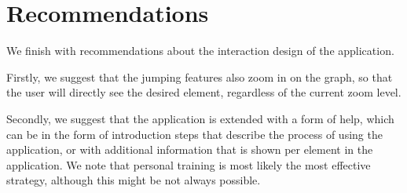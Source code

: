 \section{Recommendations}
We finish with recommendations about the interaction design of the application.
\par
Firstly, we suggest that the jumping features also zoom in on the graph, so that the user will directly see the desired element, regardless of the current zoom level.
\par
Secondly, we suggest that the application is extended with a form of help, which can be in the form of introduction steps that describe the process of using the application, or with additional information that is shown per element in the application. We note that personal training is most likely the most effective strategy, although this might be not always possible.
